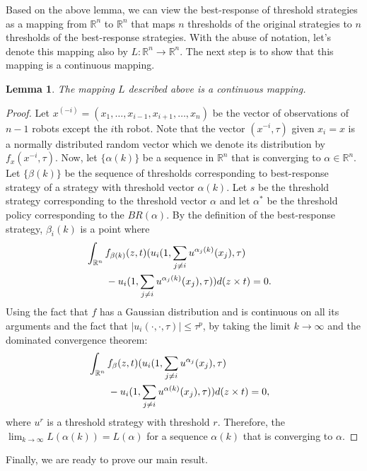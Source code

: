 \documentclass[conference]{ieeeconf}
\newtheorem{lemma}{Lemma}
\def\R{\mathbb{R}}
\begin{document}
Based on the above lemma, we can view the best-response of threshold strategies as a mapping from $\R^n$ to $\R^n$ that maps $n$ thresholds of the original strategies to $n$ thresholds of the best-response strategies. With the abuse of notation, let's denote this mapping also by $L:\R^n\to\R^n$. The next step is to show that this mapping is a continuous mapping. 
\begin{lemma}\label{lemma:continuous}
The mapping $L$ described above is a continuous mapping. 
\end{lemma}
\begin{proof}
Let $x^{(-i)}=(x_1,\ldots,x_{i-1},x_{i+1},\ldots,x_n)$ be the vector of observations of $n-1$ robots except the $i$th robot. Note that the vector $(x^{-i},\tau)$ given $x_i=x$ is a normally distributed random vector which we denote its distribution by $f_{x}(x^{-i},\tau)$. Now, let $\{\alpha(k)\}$ be a sequence in $\R^n$ that is converging to $\alpha\in\R^n$. Let $\{\beta(k)\}$ be the sequence of thresholds corresponding to best-response strategy of a strategy with threshold vector $\alpha(k)$. Let $s$ be the threshold strategy corresponding to the threshold vector $\alpha$ and let $\alpha^*$ be the threshold policy corresponding to the $BR(\alpha)$. By the definition of the best-response strategy, $\beta_i(k)$ is a point where 
\begin{align}
&\int_{\R^{n}}f_{\beta(k)}(z,t)(u_i(1,\sum_{j\not=i}u^{\alpha_j(k)}(x_j),\tau)\cr 
&\qquad-u_i(1,\sum_{j\not=i}u^{\alpha_j(k)}(x_j),\tau))d(z\times t)=0.
\end{align}
Using the fact that $f$ has a Gaussian distribution and is continuous on all its arguments and the fact that $|u_i(\cdot,\cdot,\tau)|\leq \tau^p$, by taking the limit $k\to\infty$ and the dominated convergence theorem:
\begin{align}
&\int_{\R^{n}}f_{\beta}(z,t)(u_i(1,\sum_{j\not=i}u^{\alpha_j}(x_j),\tau)\cr 
&\qquad-u_i(1,\sum_{j\not=i}u^{\alpha(k)}(x_j),\tau))d(z\times t)=0,
\end{align}
where $u^{r}$ is a threshold strategy with threshold $r$. Therefore, the $\lim_{k\to\infty}L(\alpha(k))=L(\alpha)$ for a sequence $\alpha(k)$ that is converging to $\alpha$.
\end{proof}
Finally, we are ready to prove our main result. 
\end{document}
